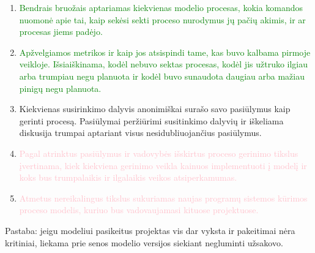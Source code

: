 \documentclass{VUMIFPSkursinis}
\begin{document}
	\begin{enumerate}
		\item{\textcolor{green}{Bendrais bruožais aptariamas kiekvienas modelio procesas, kokia komandos nuomonė apie tai, kaip sekėsi sekti proceso nurodymus jų pačių akimis, ir ar procesas jiems padėjo.}}
		\item{\textcolor{green}{Apžvelgiamos metrikos ir kaip jos atsispindi tame, kas buvo kalbama pirmoje veikloje. 
			Išsiaiškinama, kodėl nebuvo sektas procesas, kodėl jis užtruko ilgiau arba trumpiau negu planuota ir kodėl buvo sunaudota daugiau arba mažiau pinigų negu planuota.}}
		\item{Kiekvienas susirinkimo dalyvis anonimiškai surašo savo pasiūlymus kaip gerinti procesą.
			Pasiūlymai peržiūrimi susitinkimo dalyvių ir iškeliama diskusija trumpai aptariant visus nesidubliuojančius pasiūlymus.}
		\item{\textcolor{pink}{Pagal atrinktus pasiūlymus ir vadovybės išskirtus proceso gerinimo tikslus įvertinama, kiek kiekviena gerinimo veikla kainuos implementuoti į modelį ir koks bus trumpalaikis ir ilgalaikis veikos atsiperkamumas.}}
		\item{\textcolor{pink}{Atmetus nereikalingus tikslus sukuriamas naujas programų sistemos kūrimos proceso modelis, kuriuo bus vadovaujamasi kituose projektuose.}}
	\end{enumerate}

	Pastaba: jeigu modeliui pasikeitus projektas vis dar vyksta ir pakeitimai nėra kritiniai, liekama prie senos modelio versijos siekiant negluminti užsakovo.	
\end{document}
